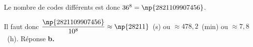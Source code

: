 %
%
%
Le nombre de codes différents est donc $36^8 = \np{2821109907456}$.

Il faut donc $\dfrac{\np{2821109907456}}{10^8} \approx \np{28211}$~(s) ou $\approx 478,2$~(min) ou $\approx 7,8$~(h). Réponse \textbf{b.}

\bigskip

